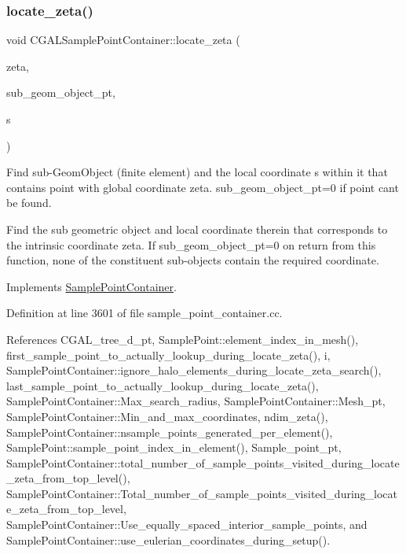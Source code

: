 \subsubsection{\texorpdfstring{locate\+\_\+zeta()}{locate\_zeta()}}
{\footnotesize\ttfamily void C\+G\+A\+L\+Sample\+Point\+Container\+::locate\+\_\+zeta (\begin{DoxyParamCaption}\item[{const Vector$<$ double $>$ \&}]{zeta,  }\item[{Geom\+Object $\ast$\&}]{sub\+\_\+geom\+\_\+object\+\_\+pt,  }\item[{Vector$<$ double $>$ \&}]{s }\end{DoxyParamCaption})\hspace{0.3cm}{\ttfamily [virtual]}}



Find sub-\/\+Geom\+Object (finite element) and the local coordinate s within it that contains point with global coordinate zeta. sub\+\_\+geom\+\_\+object\+\_\+pt=0 if point can\textquotesingle{}t be found. 

Find the sub geometric object and local coordinate therein that corresponds to the intrinsic coordinate zeta. If sub\+\_\+geom\+\_\+object\+\_\+pt=0 on return from this function, none of the constituent sub-\/objects contain the required coordinate. 

Implements \hyperlink{classSamplePointContainer_acca8dbae8346d6c8924b1f815aa5f049}{Sample\+Point\+Container}.



Definition at line 3601 of file sample\+\_\+point\+\_\+container.\+cc.



References C\+G\+A\+L\+\_\+tree\+\_\+d\+\_\+pt, Sample\+Point\+::element\+\_\+index\+\_\+in\+\_\+mesh(), first\+\_\+sample\+\_\+point\+\_\+to\+\_\+actually\+\_\+lookup\+\_\+during\+\_\+locate\+\_\+zeta(), i, Sample\+Point\+Container\+::ignore\+\_\+halo\+\_\+elements\+\_\+during\+\_\+locate\+\_\+zeta\+\_\+search(), last\+\_\+sample\+\_\+point\+\_\+to\+\_\+actually\+\_\+lookup\+\_\+during\+\_\+locate\+\_\+zeta(), Sample\+Point\+Container\+::\+Max\+\_\+search\+\_\+radius, Sample\+Point\+Container\+::\+Mesh\+\_\+pt, Sample\+Point\+Container\+::\+Min\+\_\+and\+\_\+max\+\_\+coordinates, ndim\+\_\+zeta(), Sample\+Point\+Container\+::nsample\+\_\+points\+\_\+generated\+\_\+per\+\_\+element(), Sample\+Point\+::sample\+\_\+point\+\_\+index\+\_\+in\+\_\+element(), Sample\+\_\+point\+\_\+pt, Sample\+Point\+Container\+::total\+\_\+number\+\_\+of\+\_\+sample\+\_\+points\+\_\+visited\+\_\+during\+\_\+locate\+\_\+zeta\+\_\+from\+\_\+top\+\_\+level(), Sample\+Point\+Container\+::\+Total\+\_\+number\+\_\+of\+\_\+sample\+\_\+points\+\_\+visited\+\_\+during\+\_\+locate\+\_\+zeta\+\_\+from\+\_\+top\+\_\+level, Sample\+Point\+Container\+::\+Use\+\_\+equally\+\_\+spaced\+\_\+interior\+\_\+sample\+\_\+points, and Sample\+Point\+Container\+::use\+\_\+eulerian\+\_\+coordinates\+\_\+during\+\_\+setup().


